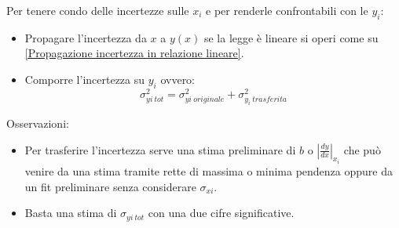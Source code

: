 \documentclass[11pt,a4paper]{book}
\begin{document}
Per tenere condo delle incertezze sulle $ x_i $ e per renderle confrontabili con le $ y_i $:
\begin{itemize}
\item Propagare l'incertezza da $ x $ a $ y(x) $ se la legge è lineare si operi come su \ref{Propagazione incertezza in relazione lineare}.
\item Comporre l'incertezza su $ y_i $ ovvero:
\begin{equation}
\sigma_{yi \ tot}^2 = \sigma_{yi\ originale}^2 + \sigma_{y_i \ trasferita}^2
\end{equation}
\end{itemize}
Osservazioni:
\begin{itemize}
\item Per trasferire l'incertezza serve una stima preliminare di $ b $ o $ \left| \frac{dy}{dx} \right|_{x_i} $ che può venire da una stima tramite rette di massima o minima pendenza oppure da un fit preliminare senza considerare $ \sigma_{xi} $.
\item Basta una stima di $ \sigma_{yi \ tot} $ con una due cifre significative.
\end{itemize}
\end{document}
